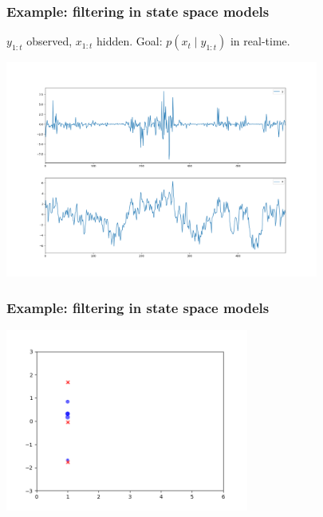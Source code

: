 \documentclass{beamer}
\begin{document}
\begin{frame}[fragile]
\frametitle{Example: filtering in state space models}

$y_{1:t}$ observed, $x_{1:t}$ hidden. Goal: $p(x_t \mid y_{1:t})$ in real-time.
\newline

\begin{center}
\includegraphics[width=103mm]{univ_svol_sim.png}
\end{center}

\end{frame}

\begin{frame}[fragile]
\frametitle{Example: filtering in state space models}

\begin{center}
\includegraphics[width=80mm]{pfilt_anim_1.png}
\end{center}

\end{frame}
\end{document}
